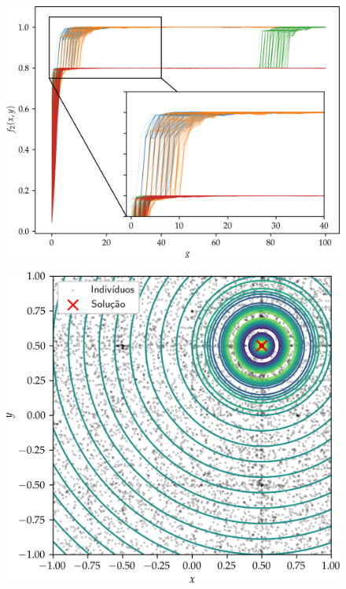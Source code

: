 \begin{frame}
  \begin{figure}
    \centering
    \includegraphics[height=0.95\textheight]{imagens/low_prob/evolution_near_gaussians.png}
  \end{figure}
\end{frame}

\begin{frame}
  \begin{figure}
    \centering
    \includegraphics[height=0.95\textheight]{imagens/high_prob/contour_damped_cossine.png}
  \end{figure}
\end{frame}

